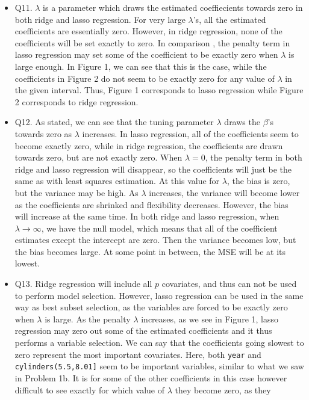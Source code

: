 \documentclass[]{article}
\begin{document}
\begin{itemize}
\item
  Q11. \(\lambda\) is a parameter which draws the estimated
  coeffiecients towards zero in both ridge and lasso regression. For
  very large \(\lambda\)'s, all the estimated coefficients are
  essentially zero. However, in ridge regression, none of the
  coefficients will be set exactly to zero. In comparison , the penalty
  term in lasso regression may set some of the coefficient to be exactly
  zero when \(\lambda\) is large enough. In Figure 1, we can see that
  this is the case, while the coefficients in Figure 2 do not seem to be
  exactly zero for any value of \(\lambda\) in the given interval. Thus,
  Figure 1 corresponds to lasso regression while Figure 2 corresponds to
  ridge regression.
\item
  Q12. As stated, we can see that the tuning parameter \(\lambda\) draws
  the \(\beta\)'s towards zero as \(\lambda\) increases. In lasso
  regression, all of the coefficients seem to become exactly zero, while
  in ridge regression, the coefficients are drawn towards zero, but are
  not exactly zero. When \(\lambda=0\), the penalty term in both ridge
  and lasso regression will disappear, so the coefficients will just be
  the same as with least squares estimation. At this value for
  \(\lambda\), the bias is zero, but the variance may be high. As
  \(\lambda\) increases, the variance will become lower as the
  coefficients are shrinked and flexibility decreases. However, the bias
  will increase at the same time. In both ridge and lasso regression,
  when \(\lambda \rightarrow \infty\), we have the null model, which
  means that all of the coefficient estimates except the intercept are
  zero. Then the variance becomes low, but the bias becomes large. At
  some point in between, the MSE will be at its lowest.
\item
  Q13. Ridge regression will include all \(p\) covariates, and thus can
  not be used to perform model selection. However, lasso regression can
  be used in the same way as best subset selection, as the variables are
  forced to be exactly zero when \(\lambda\) is large. As the penalty
  \(\lambda\) increases, as we see in Figure 1, lasso regression may
  zero out some of the estimated coefficients and it thus performs a
  variable selection. We can say that the coefficients going slowest to
  zero represent the most important covariates. Here, both \texttt{year}
  and \texttt{cylinders(5.5,8.01{]}} seem to be important variables,
  similar to what we saw in Problem 1b. It is for some of the other
  coefficients in this case however difficult to see exactly for which
  value of \(\lambda\) they become zero, as they
\end{itemize}
\end{document}
